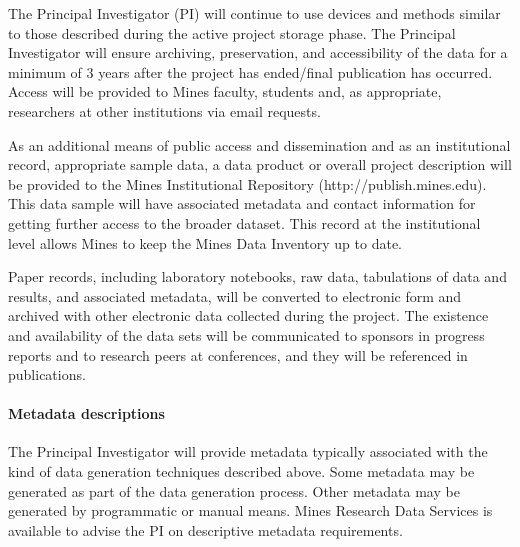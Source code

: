The Principal Investigator (PI) will continue to use devices and methods similar
to those described during the active project storage phase. The Principal
Investigator will ensure archiving, preservation, and accessibility of the data
for a minimum of 3 years after the project has ended/final publication has
occurred. Access will be provided to Mines faculty, students and, as
appropriate, researchers at other institutions via email requests.

As an additional means of public access and dissemination and as an
institutional record, appropriate sample data, a data product or overall project
description will be provided to the Mines Institutional Repository
(http://publish.mines.edu). This data sample will have associated metadata and
contact information for getting further access to the broader dataset. This
record at the institutional level allows Mines to keep the Mines Data Inventory
up to date.

Paper records, including laboratory notebooks, raw data, tabulations of data and
results, and associated metadata, will be converted to electronic form and
archived with other electronic data collected during the project. The existence
and availability of the data sets will be communicated to sponsors in progress
reports and to research peers at conferences, and they will be referenced in
publications.

\paragraph{Metadata descriptions}
The Principal Investigator will provide metadata typically associated with the
kind of data generation techniques described above. Some metadata may be
generated as part of the data generation process. Other metadata may be
generated by programmatic or manual means. Mines Research Data Services is
available to advise the PI on descriptive metadata requirements.

